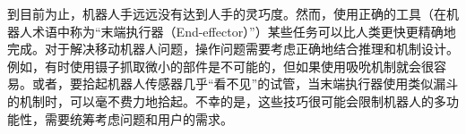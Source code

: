 到目前为止，机器人手远远没有达到人手的灵巧度。然而，使用正确的工具（在机器人术语中称为“末端执行器（End-effector）”）某些任务可以比人类更快更精确地完成。对于解决移动机器人问题，操作问题需要考虑正确地结合推理和机制设计。例如，有时使用镊子抓取微小的部件是不可能的，但如果使用吸吮机制就会很容易。或者，要拾起机器人传感器几乎“看不见”的试管，当末端执行器使用类似漏斗的机制时，可以毫不费力地拾起。不幸的是，这些技巧很可能会限制机器人的多功能性，需要统筹考虑问题和用户的需求。





